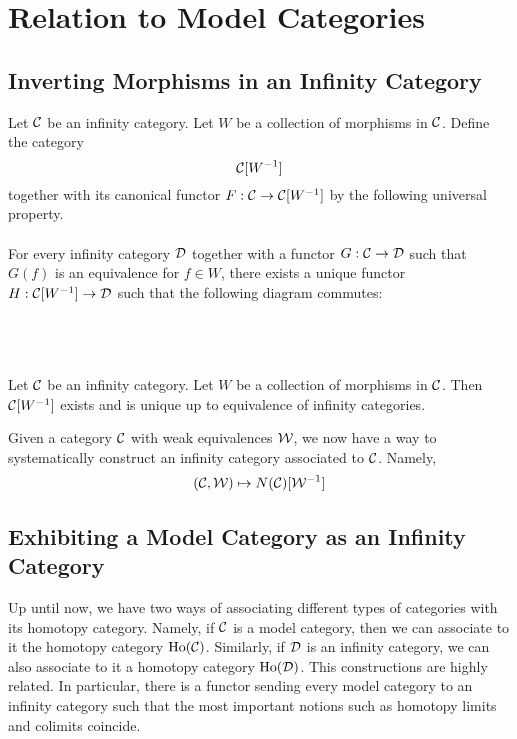 \documentclass[a4paper]{article}
\begin{document}
\pagebreak
\section{Relation to Model Categories}
\subsection{Inverting Morphisms in an Infinity Category}
\begin{defn}{}{} Let $\mathcal{C}$ be an infinity category. Let $W$ be a collection of morphisms in $\mathcal{C}$. Define the category $$\mathcal{C}[W^{-1}]$$ together with its canonical functor $F:\mathcal{C}\to\mathcal{C}[W^{-1}]$ by the following universal property. \\~\\

For every infinity category $\mathcal{D}$ together with a functor $G:\mathcal{C}\to\mathcal{D}$ such that $G(f)$ is an equivalence for $f\in W$, there exists a unique functor $H:\mathcal{C}[W^{-1}]\to\mathcal{D}$ such that the following diagram commutes: \\~\\
\\~\\
\end{defn}

\begin{prp}{}{} Let $\mathcal{C}$ be an infinity category. Let $W$ be a collection of morphisms in $\mathcal{C}$. Then $\mathcal{C}[W^{-1}]$ exists and is unique up to equivalence of infinity categories. 
\end{prp}

Given a category $\mathcal{C}$ with weak equivalences $\mathcal{W}$, we now have a way to systematically construct an infinity category associated to $\mathcal{C}$. Namely, $$(\mathcal{C},\mathcal{W})\mapsto N(\mathcal{C})[\mathcal{W}^{-1}]$$

\subsection{Exhibiting a Model Category as an Infinity Category}
Up until now, we have two ways of associating different types of categories with its homotopy category. Namely, if $\mathcal{C}$ is a model category, then we can associate to it the homotopy category $\text{Ho}(\mathcal{C})$. Similarly, if $\mathcal{D}$ is an infinity category, we can also associate to it a homotopy category $\text{Ho}(\mathcal{D})$. This constructions are highly related. In particular, there is a functor sending every model category to an infinity category such that the most important notions such as homotopy limits and colimits coincide. \\
\end{document}

